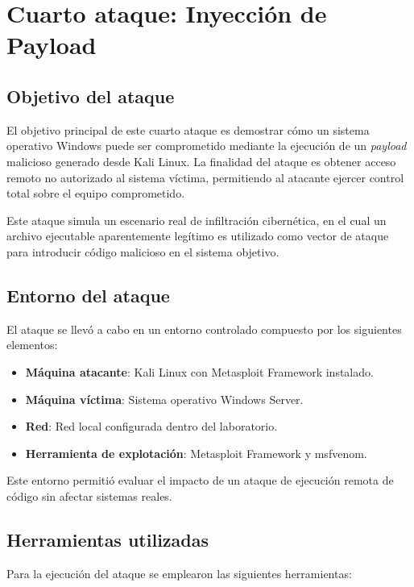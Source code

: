 \section{Cuarto ataque: Inyección de Payload}

\subsection{Objetivo del ataque}

El objetivo principal de este cuarto ataque es demostrar cómo un sistema operativo Windows puede ser comprometido mediante la ejecución de un \textit{payload} malicioso generado desde Kali Linux.  
La finalidad del ataque es obtener acceso remoto no autorizado al sistema víctima, permitiendo al atacante ejercer control total sobre el equipo comprometido.

Este ataque simula un escenario real de infiltración cibernética, en el cual un archivo ejecutable aparentemente legítimo es utilizado como vector de ataque para introducir código malicioso en el sistema objetivo.

\subsection{Entorno del ataque}

El ataque se llevó a cabo en un entorno controlado compuesto por los siguientes elementos:

\begin{itemize}
    \item \textbf{Máquina atacante}: Kali Linux con Metasploit Framework instalado.
    \item \textbf{Máquina víctima}: Sistema operativo Windows Server.
    \item \textbf{Red}: Red local configurada dentro del laboratorio.
    \item \textbf{Herramienta de explotación}: Metasploit Framework y msfvenom.
\end{itemize}

Este entorno permitió evaluar el impacto de un ataque de ejecución remota de código sin afectar sistemas reales.

\subsection{Herramientas utilizadas}

Para la ejecución del ataque se emplearon las siguientes herramientas:

